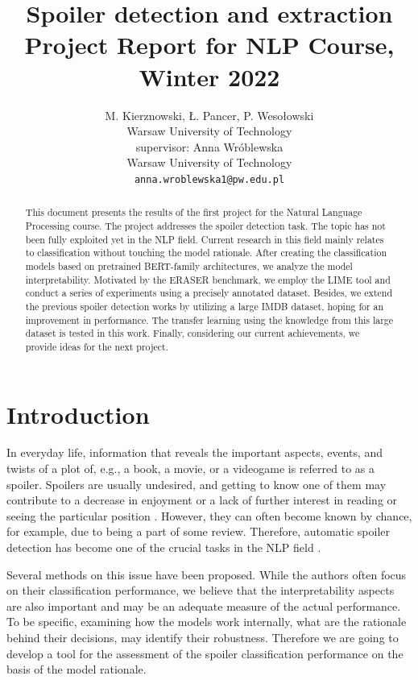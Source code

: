 \documentclass[11pt]{article}
\title{Spoiler detection and extraction\\Project Report for NLP Course, Winter 2022}
\author{M. Kierznowski, Ł. Pancer, P. Wesołowski \\
  Warsaw University of Technology \\
  \And
    supervisor: Anna Wróblewska \\
  Warsaw University of Technology \\
    {\tt anna.wroblewska1@pw.edu.pl}
    }
\date{}
\begin{document}
\maketitle
\begin{abstract}
This document presents the results of the first project for the Natural Language Processing course. The project addresses the spoiler detection task. The topic has not been fully exploited yet in the NLP field. Current research in this field mainly relates to classification without touching the model rationale. After creating the classification models based on pretrained BERT-family architectures, we analyze the model interpretability. Motivated by the ERASER benchmark, we employ the LIME tool and conduct a series of experiments using a precisely annotated dataset. Besides, we extend the previous spoiler detection works by utilizing a large IMDB dataset, hoping for an improvement in performance. The transfer learning using the knowledge from this large dataset is tested in this work. Finally, considering our current achievements, we provide ideas for the next project. 
\end{abstract}

\section{Introduction}

In everyday life, information that reveals the important aspects, events, and twists of a plot of, e.g., a book, a movie, or a videogame is referred to as a spoiler. Spoilers are usually undesired, and getting to know one of them may contribute to a decrease in enjoyment \cite{abbott2020can} or a lack of further interest in reading or seeing the particular position \cite{li2022exploring}. However, they can often become known by chance, for example, due to being a part of some review. Therefore, automatic spoiler detection has become one of the crucial tasks in the NLP field \cite{guo2010finding}.

Several methods on this issue have been proposed. While the authors often focus on their classification performance, we believe that the interpretability aspects are also important and may be an adequate measure of the actual performance. To be specific, examining how the models work internally, what are the rationale behind their decisions, may identify their robustness. Therefore we are going to develop a tool for the assessment of the spoiler classification performance on the basis of the model rationale.
\end{document}
